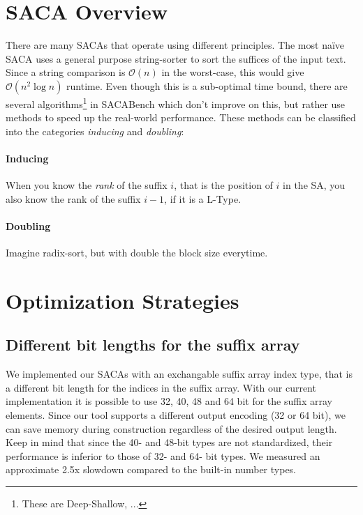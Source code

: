 \section{SACA Overview}

There are many SACAs that operate using different principles.
The most na\"ive SACA uses a general purpose string-sorter to sort the suffices of the input text.
Since a string comparison is $\mathcal O (n)$ in the worst-case, this would give $\mathcal O (n^2 \log n)$ runtime.
Even though this is a sub-optimal time bound,
there are several algorithms\footnote{These are Deep-Shallow, ...} in SACABench which don't improve on this,
but rather use methods to speed up the real-world performance.
These methods can be classified into the categories \emph{inducing} and \emph{doubling}:
%
\paragraph{Inducing} When you know the \emph{rank} of the suffix $i$, that is the position of $i$ in the SA, you also know the rank of the suffix $i-1$, if it is a L-Type.
\paragraph{Doubling} Imagine radix-sort, but with double the block size everytime. 

\bigskip

\blindtext

\section{Optimization Strategies}
\subsection{Different bit lengths for the suffix array}

We implemented our SACAs with an exchangable suffix array index type, that is a different bit length for the indices in the suffix array.
With our current implementation it is possible to use 32, 40, 48 and 64 bit for the suffix array elements.
Since our tool supports a different output encoding (32 or 64 bit), we can save memory during construction regardless of the desired output length.
Keep in mind that since the 40- and 48-bit types are not standardized, their performance is inferior to those of 32- and 64- bit types.
We measured an approximate 2.5x slowdown compared to the built-in number types.

